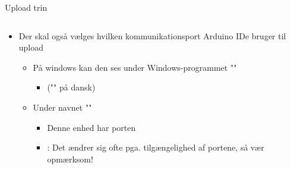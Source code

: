 \documentclass[aspectratio=169]{beamer}
\begin{document}
\begin{frame}{Upload trin}
\begin{columns}
	\begin{column}{0.5\textwidth}
		\begin{textBox}
			\begin{itemize}
				\item Der skal også vælges hvilken kommunikationsport Arduino IDe bruger til upload
				\begin{itemize}
					\item På windows kan den ses under Windows-programmet ""
					\begin{itemize}
						\item ("" på dansk)
					\end{itemize}
					\item Under navnet ""
					\begin{itemize}
						\item Denne enhed har porten 
						\item {}: Det ændrer sig ofte pga. tilgængelighed af portene, så vær opmærksom!
					\end{itemize}
				\end{itemize}
			\end{itemize}
		\end{textBox}
	\end{column}

\end{columns}
\end{frame}
\end{document}
